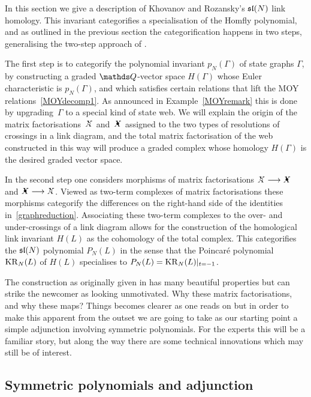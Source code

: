 \documentclass{compositio}
\theoremstyle{definition}
\numberwithin{equation}{section}
\begin{document}
In this section we give a description of Khovanov and Rozansky's $\mathfrak{sl}(N)$ link homology. This invariant categorifies a specialisation of the Homfly polynomial, and as outlined in the previous section the categorification happens in two steps, generalising the two-step approach of \cite{moy1998}. 

The first step is to categorify the polynomial invariant $p_N(\Gamma)$ of state graphs $\Gamma$, by constructing a graded $\QQ$-vector space $H(\Gamma)$ whose Euler characteristic is $p_N(\Gamma)$, and which satisfies certain relations that lift the MOY relations~\eqref{MOYdecomp1}. As announced in Example~\ref{MOYremark} this is done by upgrading~$\Gamma$ to a special kind of state web. We will explain the origin of the matrix factorisations~$\Xcirc$ and~$\Xbul$ assigned to the two types of resolutions of crossings in a link diagram, and the total matrix factorisation of the web constructed in this way will produce a graded complex whose homology $H(\Gamma)$ is the desired graded vector space.

In the second step one considers morphisms of matrix factorisations $\Xcirc \lto \Xbul$ and $\Xbul \lto \Xcirc$. Viewed as two-term complexes of matrix factorisations these morphisms categorify the differences on the right-hand side of the identities in~\eqref{graphreduction}. Associating these two-term complexes to the over- and under-crossings of a link diagram allows for the construction of the homological link invariant $H(L)$ as the cohomology of the total complex. This categorifies the $\mathfrak{sl}(N)$ polynomial $P_{N}(L)$ in the sense that the Poincar\'e polynomial $\operatorname{KR}_{N}(L)$ of $H(L)$ specialises to $P_{N}(L)=\operatorname{KR}_{N}(L)|_{t=-1}$. 

The construction as originally given in \cite{kr0401268} has many beautiful properties but can strike the newcomer as looking unmotivated. Why these matrix factorisations, and why these maps? Things becomes clearer as one reads on \cite{k0510265,RouquierMexico} but in order to make this apparent from the outset we are going to take as our starting point a simple adjunction involving symmetric polynomials. For the experts this will be a familiar story, but along the way there are some technical innovations which may still be of interest.

\subsection{Symmetric polynomials and adjunction}
\end{document}
